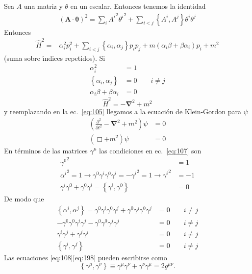 Sea $A$ una matriz y $\theta$ en un escalar. Entonces tenemos la identidad
\begin{align}
  \label{eq:206}
  (\mathbf{A}\cdot\boldsymbol{\theta})^2=\sum_i {A^i}^2 {\theta^i}^2+\sum_{i\lt j}\left\{A^i,A^j  \right\}\theta^i \theta^j 
\end{align}
Entonces
\begin{align}
  \hat{H}^2=&\alpha_i^2p_i^2+\sum_{i\lt j}\left\{\alpha_i,\alpha_j\right\}p_i p_j+m(\alpha_i \beta+\beta\alpha_i)p_i+m^2
\end{align}
(suma sobre \'\i ndices repetidos). Si
\begin{align}
  \label{eq:107}
  \alpha_i^2&=1\nonumber\\
  \left\{\alpha_i,\alpha_j\right\}&=0\qquad i\neq j\nonumber\\
  \alpha_i \beta+\beta\alpha_i&=0
\end{align}
\begin{equation}
  \hat{H}^2=-\boldsymbol{\nabla}^2+m^2
\end{equation}
y reemplazando en la ec.~\eqref{eq:105} llegamos a la ecuaci\'on de Klein-Gordon para $\psi$
\begin{align}
   \left(\frac{\partial^2}{\partial t^2}-\boldsymbol{\nabla}^2+m^2\right)\psi&=0\nonumber\\
   \left(\Box+m^2\right)\psi&=0
\end{align}
En t\'erminos de las matrices $\gamma^\mu$ las condiciones en ec.~\eqref{eq:107} son
\begin{align}
  \label{eq:108}
  {\gamma^0}^2&=1\nonumber\\
  {\alpha^i}^2=1\to\gamma^0\gamma^i \gamma^0\gamma^i=-{\gamma^i}^2=1\to{\gamma^i}^2&=-1\nonumber\\
  \gamma^i \gamma^0+\gamma^0\gamma^i=\left\{\gamma^i,\gamma^0\right\}&=0
\end{align}
De modo que
\begin{align}
  \label{eq:198}
\left\{\alpha^i,\alpha^j\right\}=\gamma^0\gamma^i \gamma^0\gamma^j+\gamma^0\gamma^j \gamma^0\gamma^j&=0\qquad i\neq j\nonumber\\
-\gamma^0\gamma^0\gamma^i \gamma^j-\gamma^0\gamma^0\gamma^j \gamma^j&=0\qquad i\neq j\nonumber\\
\gamma^i \gamma^j+\gamma^j \gamma^j&=0\qquad i\neq j\nonumber\\
\left\{\gamma^i,\gamma^j\right\}&=0\qquad i\neq j
\end{align}
Las ecuaciones \eqref{eq:108}\eqref{eq:198} pueden escribirse como
\begin{equation}
  \label{eq:109}
  \left\{\gamma^\mu,\gamma^\nu\right\}\equiv\gamma^\mu\gamma^\nu+\gamma^\nu\gamma^\mu=2g^{\mu\nu}.
\end{equation}
